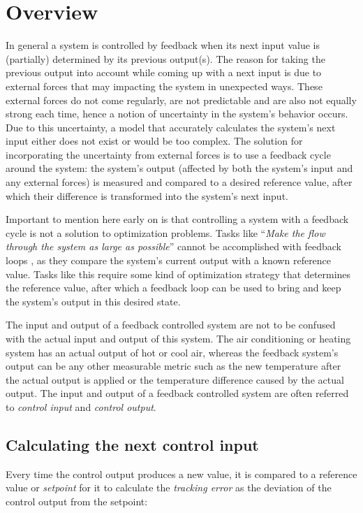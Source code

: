 \section{Overview}
In general a system is controlled by feedback when its next input value is (partially) determined by its previous output(s). The reason for taking the previous output into account while coming up with a next input is due to external forces that may impacting the system in unexpected ways. These external forces do not come regularly, are not predictable and are also not equally strong each time, hence a notion of uncertainty in the system's behavior occurs. Due to this uncertainty, a model that accurately calculates the system's next input either does not exist or would be too complex. The solution for incorporating the uncertainty from external forces is to use a feedback cycle around the system: the system's output (affected by both the system's input and any external forces) is measured and compared to a desired reference value, after which their difference is transformed into the system's next input.

Important to mention here early on is that controlling a system with a feedback cycle is not a solution to optimization problems. Tasks like ``\textit{Make the flow through the system as large as possible}'' cannot be accomplished with feedback loops \cite{janert2013-feedback}, as they compare the system's current output with a known reference value. Tasks like this require some kind of optimization strategy that determines the reference value, after which a feedback loop can be used to bring and keep the system's output in this desired state.

The input and output of a feedback controlled system are not to be confused with the actual input and output of this system. The air conditioning or heating system has an actual output of hot or cool air, whereas the feedback system's output can be any other measurable metric such as the new temperature after the actual output is applied or the temperature difference caused by the actual output. The input and output of a feedback controlled system are often referred to \textit{control input} and \textit{control output}.

\subsection{Calculating the next control input}
Every time the control output produces a new value, it is compared to a reference value or \textit{setpoint} for it to calculate the \textit{tracking error} as the deviation of the control output from the setpoint:

